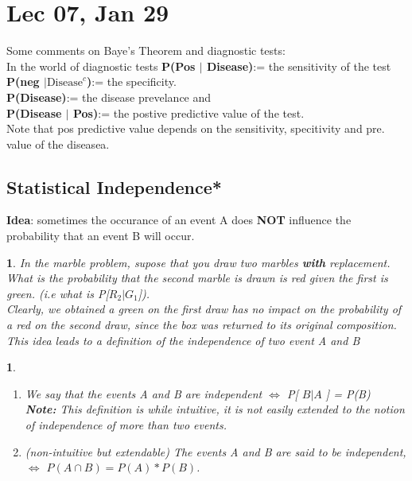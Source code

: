 \documentclass[11pt]{article}
\newtheorem{definition}{\framebox{DEF}}[section]
\newtheorem{example}{\framebox{Ex}}[section]
\newcommand\tab[1][1cm]{\hspace*{#1}}
\begin{document}
    \newpage
    \section{Lec 07, Jan 29}
        Some comments on Baye's Theorem and diagnostic tests: \\
        In the world of diagnostic tests \textbf{P(Pos $|$ Disease)}:= the sensitivity of the test\\
        \textbf{ P(neg $| \text{Disease}^c$)}:= the specificity.\\
        \textbf{P(Disease)}:= the disease prevelance and\\ 
        \textbf{P(Disease $|$ Pos)}:= the postive predictive value of the test.\\
        Note that pos predictive value depends on the sensitivity, specitivity and pre. value of the diseasea. \\
        
        \subsection{Statistical Independence*}
            \textbf{Idea}: sometimes the occurance of an event A 
                            does \textbf{NOT} influence the probability that an event B will occur.
            \begin{example}
                In the marble problem, supose that you draw two marbles \textbf{with} replacement. 
                What is the probability that the second marble is drawn is red given the first is green. 
                (i.e what is P[$R_2 | G_1$]). \\
                Clearly, we obtained a green on the first draw has no impact on the probability of a red on the second draw, 
                since the box was returned to its original composition.
                This idea leads to a definition of the independence of two event A and B
            \end{example}
            
            \begin{definition}
                \tab
                \begin{enumerate}
                    \item  We say that the events A and B are independent $\iff $ P[ $B | A$ ] = P(B) \\
                            \textbf{Note:} This definition is while intuitive, it is not easily extended to the notion of independence of more than two events.
                    \item (non-intuitive but extendable) The events A and B are said to be independent, 
                            \\$\iff $ $P(A \cap B) = P(A)*P(B)$.
                \end{enumerate}
            \end{definition}
\end{document}
